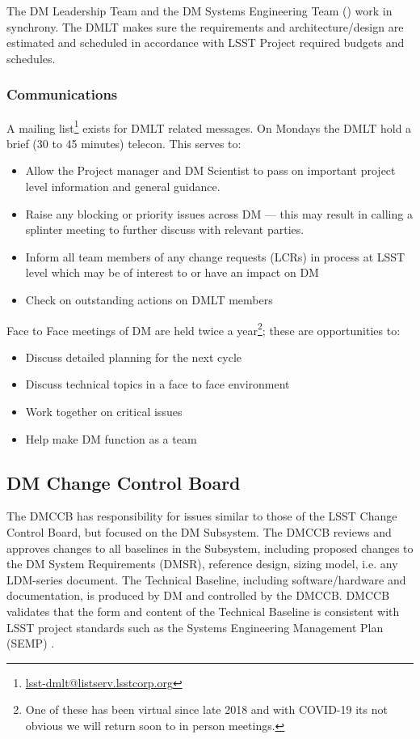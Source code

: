 The DM Leadership Team and the DM Systems Engineering Team () work in synchrony.
The DMLT makes sure the requirements and architecture/design are estimated and scheduled in accordance with LSST Project required budgets and schedules.

 \subsubsection{Communications}
A mailing list\footnote{\url{lsst-dmlt@listserv.lsstcorp.org}} exists for DMLT related messages.
On Mondays the DMLT hold a brief (30 to 45 minutes) telecon. This serves to:

\begin{itemize}
\item Allow the Project manager and DM Scientist  to pass on important project level information and general guidance.
\item Raise any blocking or priority issues across DM --- this may result in calling a splinter meeting to further discuss with relevant parties.
\item Inform all team members of any change requests (LCRs) in process at LSST level which may be of interest to or have an impact on DM
\item Check on outstanding actions on DMLT members
\end{itemize}

Face to Face meetings of DM are held twice a year\footnote{One of these has been virtual since late 2018 and with COVID-19 its not obvious we will return soon to in person meetings.}; these are opportunities to:

\begin{itemize}
\item Discuss detailed planning for the next cycle
\item Discuss technical topics in a face to face environment
\item Work together on critical issues
\item Help make DM function as a team
\end{itemize}

\subsection{DM Change Control Board \label{sect:dmccb}}

The DMCCB has responsibility for issues similar to those of the LSST Change Control Board, but focused on the DM Subsystem.
The DMCCB reviews and approves changes to all baselines in the Subsystem, including proposed changes to the DM System Requirements (DMSR), reference design, sizing model, i.e. any LDM-series document.
The Technical Baseline, including software/hardware and documentation, is produced by DM and controlled by the DMCCB.
DMCCB validates that the form and content of the Technical Baseline is consistent with LSST project standards such as the Systems Engineering Management Plan (SEMP) .

